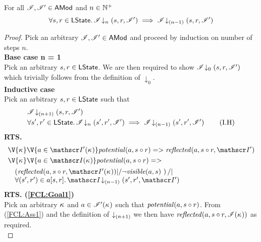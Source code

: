 \begin{lemma}[]\label{lem:future-closure}
For all $\mathscr{I}, \mathscr{I}' \in \textsf{AMod}$ and $n \in \mathbb{N}^{+}$
%
\[
	\forall s, r \in \textsf{LState}.\, \mathscr{I} \!\downarrow_{n} \left(s, r, \mathscr{I}'\right) \implies \mathscr{I} \!\downarrow_{(n-1)} \left(s, r, \mathscr{I}'\right)
\]
%
\begin{proof} Pick an arbitrary $\mathscr{I}, \mathscr{I}' \in \textsf{AMod}$ and proceed by induction on number of steps $n$.\\

\noindent\textbf{Base case n = 1}\\
Pick an arbitrary $s, r \in \textsf{LState}$. We are then required to show $\mathscr{I} \!\downarrow_{0} \left(s, r, \mathscr{I}'\right)$ which trivially follows from the definition of $\downarrow_0$.\\

\noindent\textbf{Inductive case}\\
Pick an arbitrary $s, r \in \textsf{LState}$ such that
%
\begin{align}
	& \mathscr{I} \!\downarrow_{(n+1)} \left(s, r, \mathscr{I}'\right) \label{FCL:Ass1}\\
	& \forall s', r' \in \textsf{LState}.\, \mathscr{I} \!\downarrow_{n} \left(s', r', \mathscr{I}'\right) \implies \mathscr{I} \!\downarrow_{(n-1)} \left(s', r', \mathscr{I}'\right) \tag{I.H} \label{FCL:IH}
\end{align}
%
\textbf{RTS. }
%
\begin{align} 
	&\V{\ca{}}\V{a\in \lmod'(\ca{})}
  \m{potential}(a,s \composeL r) => \m{reflected}(a, s \composeL r, \lmod') \label{FCL:Goal1}\\
  &\V{\ca{}}\V{a\in \lmod(\ca{})}
  \m{potential}(a,s \composeL r) =>\null \nonumber \\
	& \quad\begin{array}{@{} l @{}}
		\left(\m{reflected}(a, s \composeL r, \lmod'(\ca{})) |/ \neg\m{visible}(a, s) \ \right) /| \\
		\for{(s', r') \in a[s, r]} \extendsAMUpto{\lmod}{(n-1)}{s'}{r'}{\lmod'}
 	\end{array} \label{FCL:Goal2}
\end{align}
%
\noindent\textbf{RTS. (\ref{FCL:Goal1})}\\
Pick an arbitrary $\kappa_{}$ and $a \in \mathscr{I}'(\kappa_{})$ such that $\mathit{potential}(a, s \circ r)$. From (\ref{FCL:Ass1}) and the definition of $\downarrow_{(n+1)}$ we then have $\mathit{reflected}(a, s \circ r, \mathscr{I}(\kappa_{}))$
%
as required.\\


\end{proof}
\end{lemma}
